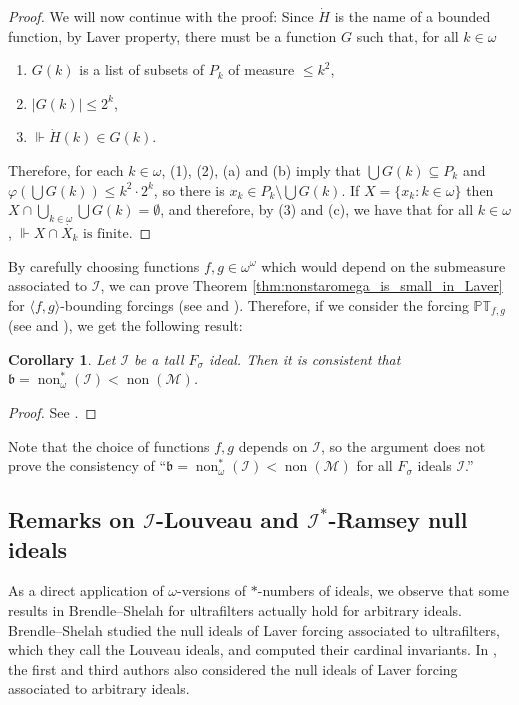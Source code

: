 \documentclass[a4paper,12pt]{amsart}
\newtheorem{cor}[thm]{Corollary}
\theoremstyle{definition}
\numberwithin{thm}{section}
\numberwithin{equation}{section}
\newcommand{\oo}{{\omega}^\omega}
\newcommand{\bb}{\mathfrak{b}}
\DeclareMathOperator{\non}{non}
\newcommand{\forces}{\Vdash}
\newcommand{\I}{\mathscr{I}}
\begin{document}
\begin{proof}
        We will now continue with the proof: Since $\dot{H}$ is the name of a bounded function, by Laver property, there must be a function $G$ such that, for all $k \in \omega$
        \begin{enumerate}[label = (\alph*)]
            \item $G(k)$ is a list of subsets of $P_k$ of measure $\leq k^2$, 
            \item $|G(k)| \leq 2^k$,
            \item $\forces{\dot{H}(k) \in G(k)}$.
        \end{enumerate}
        Therefore, for each $k \in \omega$, (1), (2), (a) and (b) imply that $\bigcup G(k) \subseteq P_k$ and $\varphi(\bigcup G(k)) \leq k^2 \cdot 2^k$, so there is $x_k \in P_k \setminus \bigcup G(k)$. If $X = \{ x_k : k \in \omega\}$ then $X \cap \bigcup_{k \in \omega} \bigcup G(k) = \emptyset$, and therefore, by (3) and (c), we have that for all $k \in \omega$, $\forces{X \cap \dot{X_k}\text{ is finite}}$.
    \end{proof}

    By carefully choosing functions $f,g\in\oo$ which would depend on the submeasure associated to $\I$, we can prove Theorem \ref{thm:nonstaromega_is_small_in_Laver} for $\langle f, g\rangle$-bounding forcings (see \cite[Definition 7.2.13]{BJ95} and \cite[Theorem 7.2.19]{BJ95}).  Therefore, if we consider the forcing $\mathbb{PT}_{f,g}$ (see \cite[Definition 7.3.3]{BJ95} and \cite[Theorem 7.3.9]{BJ95}), we get the following result:
    
    \begin{cor}\label{cor:Fsigma_PTfg}
        Let $\I$ be a tall $F_\sigma$ ideal. Then it is consistent that $\bb = \non^*_\omega(\I) < \non(\mathcal{M})$.
    \end{cor}
    \begin{proof}
        See \cite[Model 7.6.6]{BJ95}.
    \end{proof}

    Note that the choice of functions $f,g$ depends on $\I$, so the argument does not prove the consistency of ``$\bb = \non^*_\omega(\I) < \non(\mathcal{M})$ for all $F_\sigma$ ideals $\I$.''


    \subsection{Remarks on $\I$-Louveau and $\I^*$-Ramsey null ideals}\label{sec:Louveau_Ramsey}

    As a direct application of $\omega$-versions of $*$-numbers of ideals, we observe that some results in Brendle--Shelah \cite{BS99} for ultrafilters actually hold for arbitrary ideals. Brendle--Shelah \cite{BS99} studied the null ideals of Laver forcing associated to ultrafilters, which they call the Louveau ideals, and computed their cardinal invariants. In \cite{CM25}, the first and third authors also considered the null ideals of Laver forcing associated to arbitrary ideals. 
\end{document}
